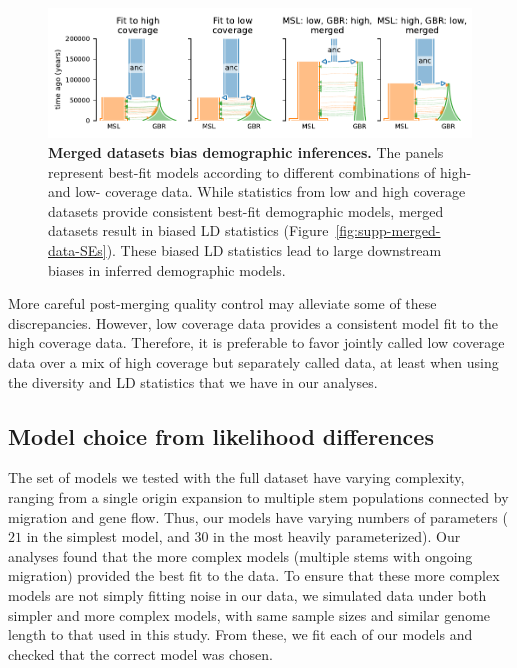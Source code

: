 \documentclass[]{article}
\begin{document}
\begin{figure}[ht!]
    \centering
    \includegraphics{figures/supp-merged-data-model-fits}
    \caption{
        \textbf{Merged datasets bias demographic inferences.}
        The panels represent best-fit models according to 
        different combinations of high- and low- coverage data.
        While statistics from low and high coverage datasets provide consistent
        best-fit demographic models, merged datasets result in biased LD
        statistics (Figure~\ref{fig:supp-merged-data-SEs}). These biased LD
        statistics lead to large downstream biases in inferred demographic
        models. 
    }
    \label{fig:supp-merged-data-fits}
\end{figure}

More careful post-merging quality control may alleviate some of these
discrepancies. However, low coverage data provides a consistent model fit to
the high coverage data. Therefore, it is preferable to favor jointly called low
coverage data over a mix of high coverage but separately called data, at least
when using the diversity and LD statistics that we have in our analyses.

\subsection{Model choice from likelihood differences}
\label{sec:refit-simulated-data}

The set of models we tested with the full dataset have varying complexity,
ranging from a single origin expansion to multiple stem populations connected
by migration and gene flow. Thus, our models have varying numbers of parameters
($21$ in the simplest model, and $30$ in the most heavily parameterized). Our
analyses found that the more complex models (multiple stems with ongoing
migration) provided the best fit to the data. To ensure that these more complex
models are not simply fitting noise in our data, we simulated data under both
simpler and more complex models, with same sample sizes and similar genome
length to that used in this study. From these, we fit each of our models and
checked that the correct model was chosen.
\end{document}
